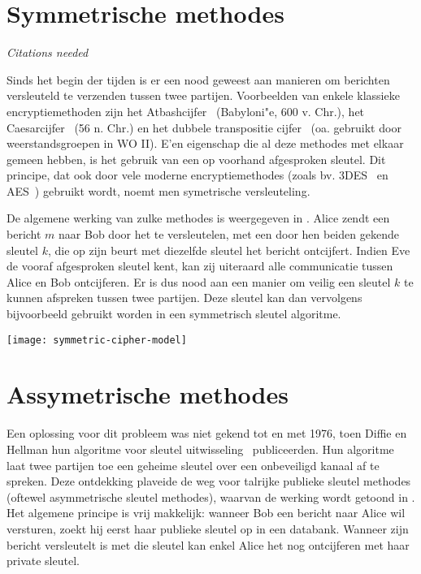 
\section{Symmetrische methodes}

\emph{Citations needed}

Sinds het begin der tijden is er een nood geweest aan manieren om berichten versleuteld te verzenden tussen twee partijen. Voorbeelden van enkele klassieke encryptiemethoden zijn het Atbashcijfer~\cite{atbash} (Babyloni"e, 600 v. Chr.), het Caesarcijfer~\cite{caesar} (56 n. Chr.) en het dubbele transpositie cijfer~\cite{double-transp} (oa. gebruikt door weerstandsgroepen in WO II). E'en eigenschap die al deze methodes met elkaar gemeen hebben, is het gebruik van een op voorhand afgesproken sleutel. Dit principe, dat ook door vele moderne encryptiemethodes (zoals bv. 3DES~\cite{3DES} en AES~\cite{AES}) gebruikt wordt, noemt men symetrische versleuteling.

De algemene werking van zulke methodes is weergegeven in . Alice zendt een bericht $m$ naar Bob door het te versleutelen, met een door hen beiden gekende sleutel $k$, die op zijn beurt met diezelfde sleutel het bericht ontcijfert. Indien Eve de vooraf afgesproken sleutel kent, kan zij uiteraard alle communicatie tussen Alice en Bob ontcijferen. Er is dus nood aan een manier om veilig een sleutel $k$ te kunnen afspreken tussen twee partijen. Deze sleutel kan dan vervolgens bijvoorbeeld gebruikt worden in een symmetrisch sleutel algoritme.

\vspace{\textfloatsep}
\begin{minipage}{\linewidth}
    \begin{center}
    \texttt{[image: symmetric-cipher-model]}
    \label{fig-encryptie-applicaties-sym-cipher}
    \end{center}
    \end{minipage}
\vspace{\textfloatsep}

\section{Assymetrische methodes}

Een oplossing voor dit probleem was niet gekend tot en met 1976, toen Diffie en Hellman hun algoritme voor sleutel uitwisseling~\cite{diffie-hellman} publiceerden. Hun algoritme laat twee partijen toe een geheime sleutel over een onbeveiligd kanaal af te spreken. Deze ontdekking plaveide de weg voor talrijke publieke sleutel methodes (oftewel asymmetrische sleutel methodes), waarvan de werking wordt getoond in . Het algemene principe is vrij makkelijk: wanneer Bob een bericht naar Alice wil versturen, zoekt hij eerst haar publieke sleutel op in een databank. Wanneer zijn bericht versleutelt is met die sleutel kan enkel Alice het nog ontcijferen met haar private sleutel.

